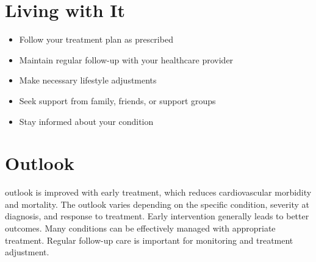 \section{Living with It}
\begin{itemize}[noitemsep]
  \item Follow your treatment plan as prescribed
  \item Maintain regular follow-up with your healthcare provider
  \item Make necessary lifestyle adjustments
  \item Seek support from family, friends, or support groups
  \item Stay informed about your condition
\end{itemize}
\section{Outlook}
outlook is improved with early treatment, which reduces cardiovascular morbidity and mortality. The outlook varies depending on the specific condition, severity at diagnosis, and response to treatment. Early intervention generally leads to better outcomes. Many conditions can be effectively managed with appropriate treatment. Regular follow-up care is important for monitoring and treatment adjustment.
